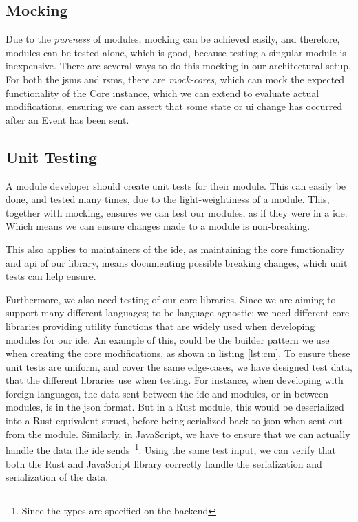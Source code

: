 \subsection{Mocking}

Due to the \textit{pureness} of modules, mocking can be achieved easily, and
therefore, modules can be tested alone, which is good, because testing a
singular module is inexpensive. There are several ways to do this mocking in our
architectural setup. For both the \gls*{jsms} and \gls*{rsms}, there are
\textit{mock-cores}, which can mock the expected functionality of the Core
instance, which we can extend to evaluate actual modifications, ensuring we can
assert that some state or \gls*{ui} change has occurred after an Event has been
sent.

\subsection{Unit Testing}

A module developer should create unit tests for their module. This can easily be
done, and tested many times, due to the light-weightiness of a module. This,
together with mocking, ensures we can test our modules, as if they were in a
\gls*{ide}. Which means we can ensure changes made to a module is non-breaking.

This also applies to maintainers of the \gls*{ide}, as maintaining the core
functionality and \gls*{api} of our library, means documenting possible breaking
changes, which unit tests can help ensure.

Furthermore, we also need testing of our core libraries. Since we are aiming to
support many different languages; to be language agnostic; we need different core
libraries providing utility functions that are widely used when developing
modules for our \gls{ide}. An example of this, could be the builder pattern we
use when creating the core modifications, as shown in listing \ref{lst:cm}.
To ensure these unit tests are uniform, and cover the same edge-cases, we have
designed test data, that the different libraries use when testing. For instance,
when developing with foreign languages, the data sent between the \gls{ide} and
modules, or in between modules, is in the \gls{json} format. But in a Rust
module, this would be deserialized into a Rust equivalent struct, before being
serialized back to \gls{json} when sent out from the module. Similarly, in
JavaScript, we have to ensure that we can actually handle the data the \gls{ide}
sends~\footnote{Since the types are specified on the backend}. Using the same
test input, we can verify that both the Rust and JavaScript library correctly
handle the serialization and serialization of the data.

